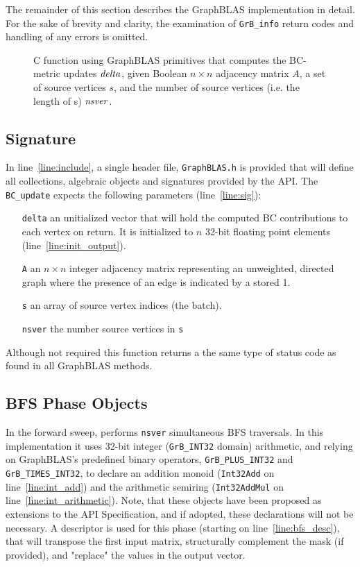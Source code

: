 The remainder of this section describes the 
GraphBLAS implementation in detail.  
For the sake of brevity and clarity, the examination of 
{\tt GrB\_info} return codes and handling of any errors is omitted.


\begin{figure*}[h]
\caption{C function using GraphBLAS primitives that computes the BC-metric
updates ${\it delta}$, given Boolean $n \times n$ adjacency matrix $A$, a
set of source vertices $s$, and the number of source vertices (i.e. the 
length of s) ${\it nsver}$.}
\label{Fig:BClisting}
{\scriptsize

}
\end{figure*}

\subsection{Signature}

In line~\ref{line:include}, a single header file, {\tt GraphBLAS.h} is provided
that will define all collections, algebraic objects and signatures provided by the
API. The {\tt BC\_update} expects the following parameters (line~\ref{line:sig}):

\begin{itemize} [leftmargin=0.6in]
\item[\tt delta] an unitialized vector that will hold the computed BC contributions to each
                 vertex on return.  It is initialized to $n$ 32-bit floating
                 point elements (line~\ref{line:init_output}).
\item[\tt A]     an $n\times n$ integer adjacency matrix representing an
                 unweighted, directed graph where the presence of an edge
                 is indicated by a stored 1.
\item[\tt s]     an array of source vertex indices (the batch).
\item[\tt nsver] the number source vertices in {\tt s}
\end{itemize}

Although not required this function returns a the same type of status code as
found in all GraphBLAS methods.

\subsection{BFS Phase Objects}
 
In the forward sweep, performs {\tt nsver} simultaneous BFS traversals.  In this
implementation it uses 32-bit integer ({\tt GrB\_INT32} domain) arithmetic, and
relying on GraphBLAS's predefined binary operators, {\tt GrB\_PLUS\_INT32} and 
{\tt GrB\_TIMES\_INT32}, to declare an addition monoid ({\tt Int32Add} on line~\ref{line:int_add})
and the arithmetic semiring ({\tt Int32AddMul} on line~\ref{line:int_arithmetic}).
Note, that these objects have been proposed as
extensions to the API Specification, and if adopted, these declarations will not
be necessary.  A descriptor is used for this phase (starting on line~\ref{line:bfs_desc}),
that will transpose the first input matrix, structurally complement the mask (if provided),
and "replace" the values in the output vector.


